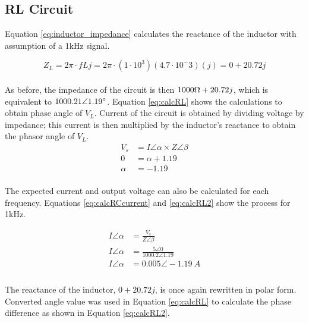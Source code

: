 \documentclass[journal]{IEEEtran}
\begin{document}
\subsection{RL Circuit}
\noindent Equation \ref{eq:inductor_impedance} calculates the reactance of the inductor with assumption of a 1kHz signal.

\begin{equation}
Z_{L} = 2\pi\cdot fLj = 2\pi \cdot (1\cdot10^3)(4.7\cdot10^-3)(j) = 0 + 20.72j
\label{eq:inductor_impedance}
\end{equation} \\

\noindent As before, the impedance of the circuit is then $1000\ohm + 20.72j$, which is equivalent to $1000.21 \angle1.19\degree$. Equation \ref{eq:calcRL} shows the calculations to obtain phase angle of ${V_L}$. Current of the circuit is obtained by dividing voltage by impedance; this current is then multiplied by the inductor's reactance to obtain the phasor angle of ${V_L}$. \\

\begin{equation}
    \begin{split}
        V_s & = I \angle \alpha \times Z \angle \beta \\
        0 & = \alpha + 1.19 \\
        \alpha & = -1.19
    \end{split}
    \label{eq:calcRL}
\end{equation} \\

\noindent The expected current and output voltage can also be calculated for each frequency. Equations \ref{eq:calcRCcurrent} and \ref{eq:calcRL2} show the process for 1kHz.

\begin{equation}
    \begin{split}
        I \angle \alpha & = \frac{V_s}{Z \angle \beta} \\
        I \angle \alpha & = \frac{5 \angle 0}{1000.2 \angle 1.19}\\
        I \angle \alpha & = 0.005 \angle -1.19 \ A\\
    \end{split}
    \label{eq:calcRCcurrent}
\end{equation} \\

\noindent The reactance of the inductor,  $0 + 20.72j$, is once again rewritten in polar form. Converted angle value was used in Equation \ref{eq:calcRL} to calculate the phase difference as shown in Equation \ref{eq:calcRL2}.
\end{document}
